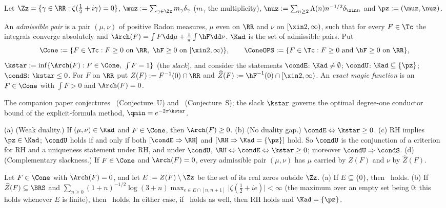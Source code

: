 Let $\Zz=\{\gamma\in\RR:\zeta(\frac12+i\gamma)=0\}$, $\muz:=\sum_{\gamma\in\Zz}m_\gamma\delta_\gamma$ ($m_\gamma$ the
multiplicity), $\nuz:=\sum_{n\ge2}\Lambda(n)n^{-1/2}\delta_{\xin n}$ and $\pz:=(\muz,\nuz)$.

\begin{definition}\label{def:admissible}
An \emph{admissible pair} is a pair $(\mu,\nu)$ of positive Radon measures, $\mu$ even on $\RR$ and $\nu$ on $[\xin2,\infty)$,
such that for every $F\in\Tc$ the integrals converge absolutely and $\Arch(F)=\int F\dd\mu+\frac1\pi\int\hF\dd\nu$. $\Kad$ is
the set of admissible pairs. Put
\[
\Cone:=\{F\in\Tc:F\ge0\text{ on }\RR,\ \hF\ge0\text{ on }[\xin2,\infty)\},\qquad
\ConeOPS:=\{F\in\Tc:F\ge0\text{ and }\hF\ge0\text{ on }\RR\},
\]
$\kstar:=\inf\{\Arch(F):F\in\Cone,\ \int F=1\}$ (the \emph{slack}), and consider the statements
$\condE$: $\Kad\ne\emptyset$; $\condU$: $\Kad\subseteq\{\pz\}$; $\condS$: $\kstar\le0$. For $F$ on $\RR$ put
$Z(F):=F^{-1}(0)\cap\RR$ and $\widehat Z(F):=\hF^{-1}(0)\cap[\xin2,\infty)$. An \emph{exact magic function} is an $F\in\Cone$ with
$\int F>0$ and $\Arch(F)=0$.
\end{definition}

The companion paper conjectures \condU\ (Conjecture~U) and \condS\ (Conjecture~S); the slack $\kstar$ governs the optimal
degree-one conductor bound of the explicit-formula method, $\qmin=e^{-2\pi\kstar}$.

\begin{fact}\label{fact:logic}
\textup{(a)} \textup{(Weak duality.)} If $(\mu,\nu)\in\Kad$ and $F\in\Cone$, then $\Arch(F)\ge0$. \textup{(b)} \textup{(No duality
gap.)} $\condE\Leftrightarrow\kstar\ge0$. \textup{(c)} RH implies $\pz\in\Kad$; $\condU$ holds if and only if both
$[\condE\Rightarrow\RH]$ and $[\RH\Rightarrow\Kad=\{\pz\}]$ hold. So $\condU$ is the conjunction of a criterion for RH and a
uniqueness statement under RH, and under $\condU$, $\RH\Leftrightarrow\condE\Leftrightarrow\kstar\ge0$; moreover
$\condU\Rightarrow\condS$. \textup{(d)} \textup{(Complementary slackness.)} If
$F\in\Cone$ and $\Arch(F)=0$, every admissible pair $(\mu,\nu)$ has $\mu$ carried by $Z(F)$ and $\nu$ by $\widehat Z(F)$.
\end{fact}

\begin{fact}\label{thm:magic-unique}
Let $F\in\Cone$ with $\Arch(F)=0$, and let $E:=Z(F)\setminus\Zz$ be the set of its real zeros outside $\Zz$.
\textup{(a)} If $E\subseteq\{0\}$, then \condU\ holds.
\textup{(b)} If $\widehat Z(F)\subseteq\BRS$ and $\sum_{n\ge0}(1+n)^{-1/2}\log(3+n)\max_{e\in E\cap[n,n+1]}\lvert\zeta(\frac12+ie)\rvert<\infty$ (the maximum
over an empty set being $0$; this holds whenever $E$ is finite), then \condU\ holds.
In either case, if \condE\ holds as well, then RH holds and $\Kad=\{\pz\}$.
\end{fact}

